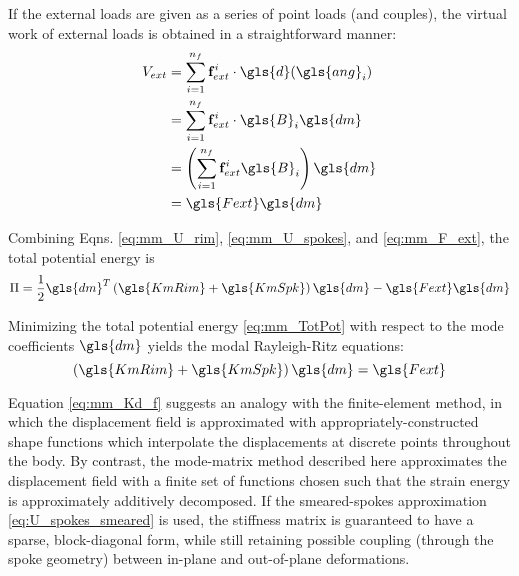 \documentclass[\rootdir/thesis.tex]{subfiles}
\begin{document}
If the external loads are given as a series of point loads (and couples), the virtual work of external loads is obtained in a straightforward manner:
\begin{align}
\label{eq:mm_F_ext}
\begin{split}
V_{ext} &= \sum_{i=1}^{n_f} \mathbf{f}_{ext}^i \cdot \gls{d}(\gls{ang}_i) \\
&= \sum_{i=1}^{n_f} \mathbf{f}_{ext}^i \cdot \gls{B}_i \gls{dm}\\
&= \left(\sum_{i=1}^{n_f} \mathbf{f}_{ext}^i \gls{B}_i \right) \gls{dm}\\
&= \gls{Fext}\gls{dm}
\end{split}
\end{align}

Combining Eqns. \eqref{eq:mm_U_rim}, \eqref{eq:mm_U_spokes}, and \eqref{eq:mm_F_ext}, the total potential energy is
\begin{equation}
\label{eq:mm_TotPot}
\Pi = \frac{1}{2} \gls{dm}^T \left( \gls{KmRim} + \gls{KmSpk} \right) \gls{dm} - \gls{Fext}\gls{dm}
\end{equation}

Minimizing the total potential energy \eqref{eq:mm_TotPot} with respect to the mode coefficients $\gls{dm}$ yields the modal Rayleigh-Ritz equations:
\begin{equation}
\label{eq:mm_Kd_f}
\left( \gls{KmRim} + \gls{KmSpk} \right) \gls{dm} = \gls{Fext}
\end{equation}

Equation \eqref{eq:mm_Kd_f} suggests an analogy with the finite-element method, in which the displacement field is approximated with appropriately-constructed shape functions which interpolate the displacements at discrete points throughout the body. By contrast, the mode-matrix method described here approximates the displacement field with a finite set of functions chosen such that the strain energy is approximately additively decomposed. If the smeared-spokes approximation \eqref{eq:U_spokes_smeared} is used, the stiffness matrix is guaranteed to have a sparse, block-diagonal form, while still retaining possible coupling (through the spoke geometry) between in-plane and out-of-plane deformations.
\end{document}
